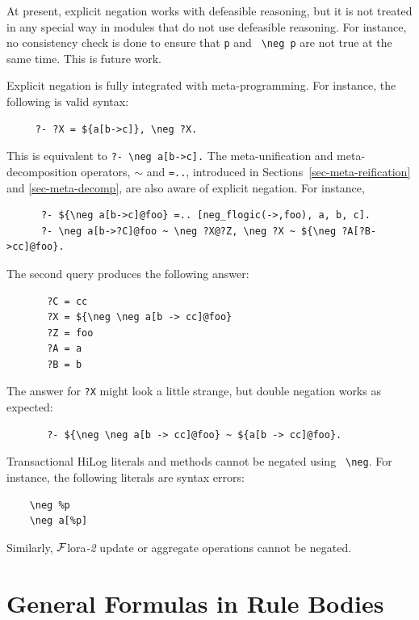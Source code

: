 \documentclass[11pt]{article}
\newcommand{\FLORA}{{\mbox{\sc ${\cal F}${lora}\rm\emph{-2}}}\xspace}
\newcommand{\FLSYSTEM}{\FLORA}
\newcommand{\bs}{\textbackslash}
\newcommand{\RULELOGNEG}{{\texttt{{\bs}neg}}\xspace}
\begin{document}
At present, explicit negation works with defeasible reasoning, but it is
not treated in any special way in modules that do not use defeasible reasoning.
For instance, no consistency check is done to ensure that {\tt p} and {\tt
  \RULELOGNEG p} are not true at the same time. This is future work.

Explicit negation is fully integrated with meta-programming. For instance,
the following is valid syntax:
\begin{verbatim}
     ?- ?X = ${a[b->c]}, \neg ?X.
\end{verbatim}
This is equivalent to \verb|?- \neg a[b->c].|  The meta-unification and
meta-decomposition operators, {\tt $\sim$} and {\tt =..}, introduced in
Sections~\ref{sec-meta-reification} and \ref{sec-meta-decomp}, are
also aware of explicit negation. For instance, 
\begin{verbatim}
      ?- ${\neg a[b->c]@foo} =.. [neg_flogic(->,foo), a, b, c].
      ?- \neg a[b->?C]@foo ~ \neg ?X@?Z, \neg ?X ~ ${\neg ?A[?B->cc]@foo}.
\end{verbatim}
The second query produces the following answer:
\begin{verbatim}
       ?C = cc
       ?X = ${\neg \neg a[b -> cc]@foo}
       ?Z = foo
       ?A = a
       ?B = b
\end{verbatim}
The answer for {\tt ?X} might look a little strange, but double negation
works as expected:
\begin{verbatim}
       ?- ${\neg \neg a[b -> cc]@foo} ~ ${a[b -> cc]@foo}.
\end{verbatim}

Transactional HiLog literals and methods cannot be negated using {\tt
  \RULELOGNEG}. For instance, the following literals are syntax errors:
\begin{verbatim}
    \neg %p
    \neg a[%p]
\end{verbatim}
Similarly, \FLSYSTEM update or aggregate operations cannot be negated.


\section{General Formulas in Rule Bodies}\label{sec-lt}
\end{document}
